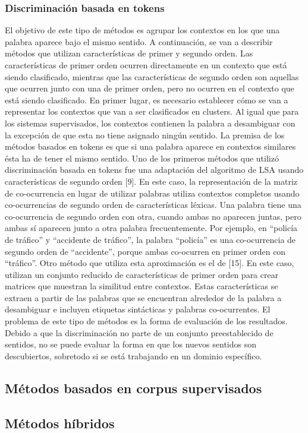 \subsubsection*{Discriminación basada en tokens}

El objetivo de este tipo de métodos es agrupar los contextos en los que una palabra aparece bajo el mismo sentido. A continuación, se van a describir métodos que utilizan características de primer y segundo orden. Las características de primer orden ocurren directamente en un contexto que está siendo clasificado, mientras que las características de segundo orden son aquellas que ocurren junto con una de primer orden, pero no ocurren en el contexto que está siendo clasificado. En primer lugar, es necesario establecer cómo se van a representar los contextos que van a ser clasificados en clusters. Al igual que para los sistemas supervisados, los contextos contienen la palabra a desambiguar con la excepción de que esta no tiene asignado ningún sentido. La premisa de los métodos basados en tokens es que si una palabra aparece en contextos similares ésta ha de tener el mismo sentido.
Uno de los primeros métodos que utilizó discriminación basada en tokens fue una adaptación del algoritmo de LSA usando características de segundo orden [9]. En este caso, la representación de la matriz de co-ocurrencia en lugar de utilizar palabras utiliza contextos completos usando co-ocurrencias de segundo orden de características léxicas. Una palabra tiene una co-ocurrencia de segundo orden con otra, cuando ambas no aparecen juntas, pero ambas sí aparecen junto a otra palabra frecuentemente. Por ejemplo, en “policía de tráfico” y “accidente de tráfico”, la palabra “policía” es una co-ocurrencia de segundo orden de “accidente”, porque ambas co-ocurren en primer orden con “tráfico”. Otro método que utiliza esta aproximación es el de [15]. En este caso, utilizan un conjunto reducido de características de primer orden para crear matrices que muestran la similitud entre contextos. Estas características se extraen a partir de las palabras que se encuentran alrededor de la palabra a desambiguar e incluyen etiquetas sintácticas y palabras co-ocurrentes.
El problema de este tipo de métodos es la forma de evaluación de los resultados. Debido a que la discriminación no parte de un conjunto preestablecido de sentidos, no se puede evaluar la forma en que los nuevos sentidos son descubiertos, sobretodo si se está trabajando en un dominio específico.

\subsection{Métodos basados en corpus supervisados}
\subsection{Métodos híbridos}
